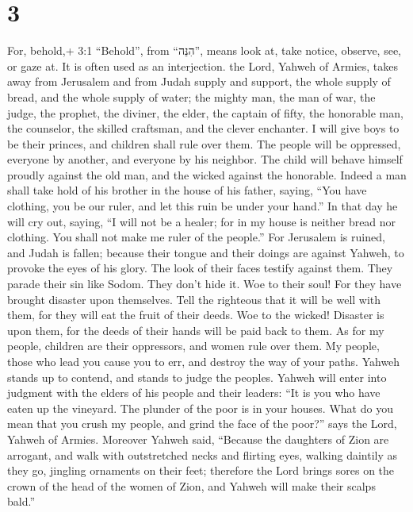 \hypertarget{section-2}{%
\section{3}\label{section-2}}

 For, behold,+ 3:1 ``Behold'', from ``הִנֵּה'', means look
at, take notice, observe, see, or gaze at. It is often used as an
interjection. the Lord, Yahweh of Armies, takes away from Jerusalem and
from Judah supply and support, the whole supply of bread, and the whole
supply of water;  the mighty man, the man of war, the judge,
the prophet, the diviner, the elder,  the captain of fifty,
the honorable man, the counselor, the skilled craftsman, and the clever
enchanter.  I will give boys to be their princes, and
children shall rule over them.  The people will be
oppressed, everyone by another, and everyone by his neighbor. The child
will behave himself proudly against the old man, and the wicked against
the honorable.  Indeed a man shall take hold of his brother
in the house of his father, saying, ``You have clothing, you be our
ruler, and let this ruin be under your hand.''  In that day
he will cry out, saying, ``I will not be a healer; for in my house is
neither bread nor clothing. You shall not make me ruler of the people.''
 For Jerusalem is ruined, and Judah is fallen; because their
tongue and their doings are against Yahweh, to provoke the eyes of his
glory.  The look of their faces testify against them. They
parade their sin like Sodom. They don't hide it. Woe to their soul! For
they have brought disaster upon themselves.  Tell the
righteous that it will be well with them, for they will eat the fruit of
their deeds.  Woe to the wicked! Disaster is upon them, for
the deeds of their hands will be paid back to them.  As for
my people, children are their oppressors, and women rule over them. My
people, those who lead you cause you to err, and destroy the way of your
paths.  Yahweh stands up to contend, and stands to judge
the peoples.  Yahweh will enter into judgment with the
elders of his people and their leaders: ``It is you who have eaten up
the vineyard. The plunder of the poor is in your houses. 
What do you mean that you crush my people, and grind the face of the
poor?'' says the Lord, Yahweh of Armies.  Moreover Yahweh
said, ``Because the daughters of Zion are arrogant, and walk with
outstretched necks and flirting eyes, walking daintily as they go,
jingling ornaments on their feet;  therefore the Lord
brings sores on the crown of the head of the women of Zion, and Yahweh
will make their scalps bald.''

